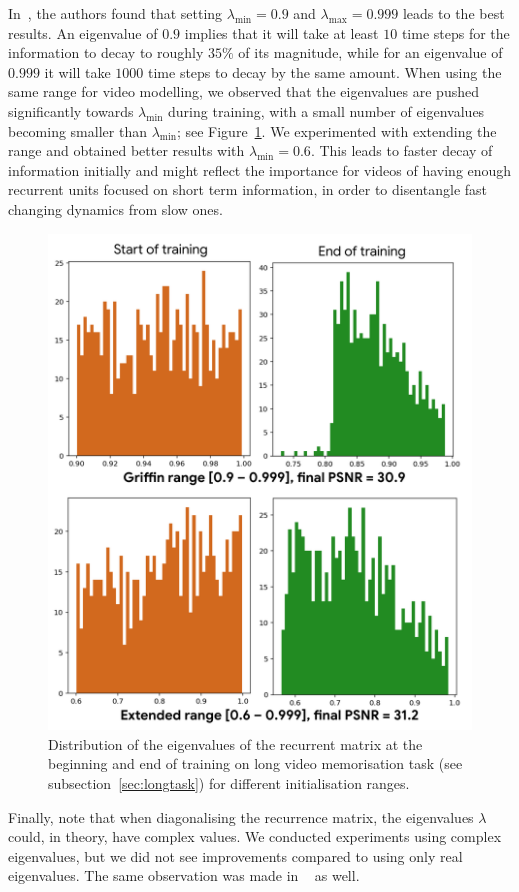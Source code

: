 In~\cite{de2024griffinmixinggatedlinear}, the authors found that setting $\lambda_{\min}=0.9$ and $\lambda_{\max}=0.999$ leads to the best results. An eigenvalue of $0.9$ implies that it will take at least $10$ time steps for the information to decay to roughly $35\%$ of its magnitude, while for an eigenvalue of $0.999$ it will take $1000$ time steps to decay by the same amount. When using the same range for video modelling, we observed that the eigenvalues are pushed significantly towards $\lambda_{\min}$ during training, with a small number of eigenvalues becoming smaller than $\lambda_{\min}$; see Figure~\ref{fig:eigs}. We experimented with extending the range and obtained better results with $\lambda_{\min}=0.6$. This leads to faster decay of information initially and might reflect the importance for videos of having enough recurrent units focused on short term information, in order to disentangle fast changing dynamics from slow ones.

\begin{figure}[h]
\centering
    \includegraphics[width=.8\linewidth]{img/eigs.png}
\caption{Distribution of the eigenvalues of the recurrent matrix at the beginning and end of training on long video memorisation task (see subsection~\ref{sec:longtask}) for different initialisation ranges.}
\label{fig:eigs}
\end{figure}

Finally, note that when diagonalising the recurrence matrix, the eigenvalues $\lambda$ could, in theory, have complex values. We conducted experiments using complex eigenvalues, but we did not see improvements compared to using only real eigenvalues. The same observation was made in ~\cite{de2024griffinmixinggatedlinear,gu2023mamba} as well. 

